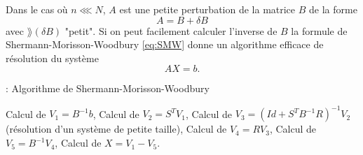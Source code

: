 Dans le cas où $n \lll N$, $A$ est une petite perturbation de la matrice $B$ de la forme 
\begin{equation}
A = B + \delta B
\end{equation}
avec $\rang  (\delta B) $ "petit". Si on peut facilement calculer l'inverse de $B$ la formule de Shermann-Morisson-Woodbury \eqref{eq:SMW} donne un algorithme efficace de résolution du système
\begin{equation}
A X = b.
\end{equation} 

\begin{center}
\begin{minipage}[H]{12cm}
  \begin{algorithm}[H]
    \caption{: Algorithme de Shermann-Morisson-Woodbury}\label{alg:SMW}
    \begin{algorithmic}[1]
	\State Calcul de $V_1 = B^{-1} b$,
	\State Calcul de $V_2 = S^T V_1$,
	\State Calcul de $V_3 = (Id + S^T B^{-1}R)^{-1} V_2$ (résolution d'un système de petite taille),
	\State Calcul de $V_4 = R V_3$,
	\State Calcul de $V_5 = B^{-1} V_4$,
	\State Calcul de $X = V_1 - V_5$.
    \end{algorithmic}
    \end{algorithm}
\end{minipage}
\end{center}

